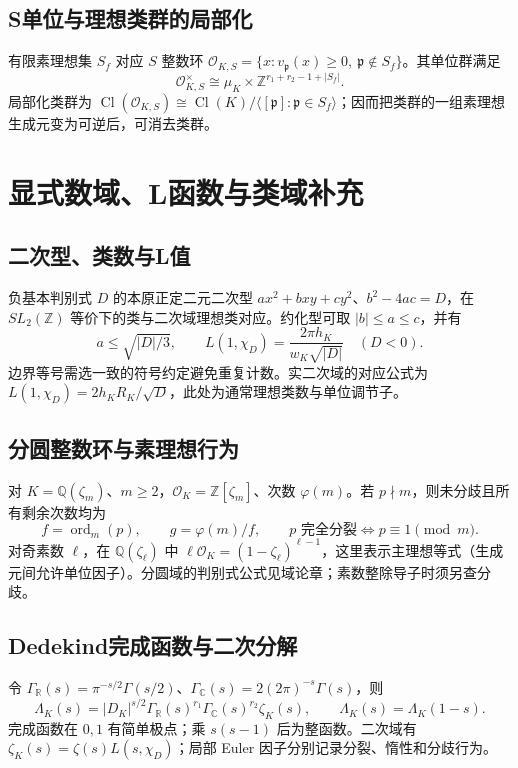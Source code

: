 \documentclass[../main.tex]{subfiles}
\begin{document}
\subsection{S单位与理想类群的局部化}
有限素理想集 $S_f$ 对应 $S$ 整数环 $\mathcal O_{K,S}=\{x:v_{\mathfrak p}(x)\ge0,\ \mathfrak p\notin S_f\}$。其单位群满足
\[
\mathcal O_{K,S}^\times\cong\mu_K\times\mathbb Z^{r_1+r_2-1+|S_f|}.
\]
局部化类群为 $\operatorname{Cl}(\mathcal O_{K,S})\cong\operatorname{Cl}(K)/\langle[\mathfrak p]:\mathfrak p\in S_f\rangle$；因而把类群的一组素理想生成元变为可逆后，可消去类群。
\section{显式数域、L函数与类域补充}
\subsection{二次型、类数与L值}
负基本判别式 $D$ 的本原正定二元二次型 $ax^2+bxy+cy^2$、$b^2-4ac=D$，在 $SL_2(\mathbb Z)$ 等价下的类与二次域理想类对应。约化型可取 $|b|\le a\le c$，并有
\[
a\le\sqrt{|D|/3},\qquad
L(1,\chi_D)=\frac{2\pi h_K}{w_K\sqrt{|D|}}\quad(D<0).
\]
边界等号需选一致的符号约定避免重复计数。实二次域的对应公式为 $L(1,\chi_D)=2h_KR_K/\sqrt D$，此处为通常理想类数与单位调节子。
\subsection{分圆整数环与素理想行为}
对 $K=\mathbb Q(\zeta_m)$、$m\ge2$，$\mathcal O_K=\mathbb Z[\zeta_m]$、次数 $\varphi(m)$。若 $p\nmid m$，则未分歧且所有剩余次数均为
\[
f=\operatorname{ord}_m(p),\qquad g=\varphi(m)/f,\qquad
p\text{ 完全分裂}\iff p\equiv1\pmod m.
\]
对奇素数 $\ell$，在 $\mathbb Q(\zeta_\ell)$ 中 $\ell\mathcal O_K=(1-\zeta_\ell)^{\ell-1}$，这里表示主理想等式（生成元间允许单位因子）。分圆域的判别式公式见域论章；素数整除导子时须另查分歧。
\subsection{Dedekind完成函数与二次分解}
令 $\Gamma_\mathbb R(s)=\pi^{-s/2}\Gamma(s/2)$、$\Gamma_\mathbb C(s)=2(2\pi)^{-s}\Gamma(s)$，则
\[
\Lambda_K(s)=|D_K|^{s/2}\Gamma_\mathbb R(s)^{r_1}\Gamma_\mathbb C(s)^{r_2}\zeta_K(s),\qquad
\Lambda_K(s)=\Lambda_K(1-s).
\]
完成函数在 $0,1$ 有简单极点；乘 $s(s-1)$ 后为整函数。二次域有 $\zeta_K(s)=\zeta(s)L(s,\chi_D)$；局部 Euler 因子分别记录分裂、惰性和分歧行为。
\end{document}
